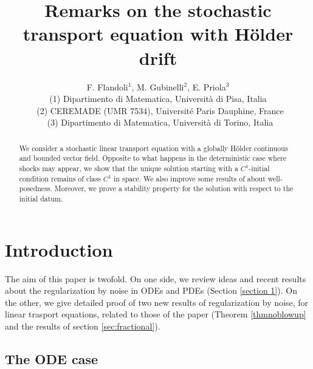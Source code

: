 \documentclass{article}
\begin{document}
%

%
 \title{Remarks on the stochastic transport equation with H\"{o}lder drift}
\author{F. Flandoli$^{1}$, M. Gubinelli$^{2}$, E. Priola$^{3}$\\{\small {(1) Dipartimento di Matematica, Universit\`{a} di Pisa, Italia}}\\{\small {\ (2) CEREMADE (UMR 7534), Universit\'e Paris Dauphine, France}}\\{\small {\ (3) Dipartimento di Matematica, Universit\`a di Torino, Italia }}}
\maketitle


\begin{abstract}
We consider a stochastic linear transport equation with a globally H\"{o}lder
continuous and bounded vector field. Opposite to what happens in the
deterministic case where shocks may appear, we show that the unique solution
starting with a $C^{1}$-initial condition remains of class $C^{1}$ in space.
We also improve some results of \cite{FGP} about well-posedness. Moreover, we
prove a stability property for the solution with respect to the initial datum.

\end{abstract}

\section{Introduction\label{section 1}}

The aim of this paper is twofold. On one side, we review ideas and recent
results about the regularization by noise in ODEs and PDEs (Section
\ref{section 1}). On the other, we give detailed proof of two new results of
regularization by noise, for linear trasport equations, related to those of
the paper \cite{FGP} (Theorem \ref{thmnoblowup} and the results of section
\ref{sec:fractional}).

\subsection{The ODE case}
\end{document}
